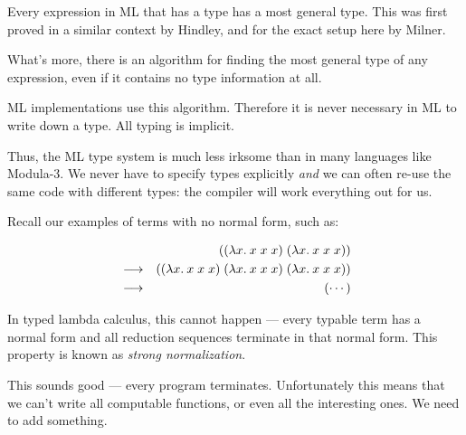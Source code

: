 \begin{slide*}


\vspace*{0.5cm}

Every expression in ML that has a type has a most general type. This was first
proved in a similar context by Hindley, and for the exact setup here by Milner.

What's more, there is an algorithm for finding the most general type of any
expression, even if it contains no type information at all.

ML implementations use this algorithm. Therefore it is never necessary in ML to
write down a type. All typing is implicit.

Thus, the ML type system is much less irksome than in many languages like
Modula-3. We never have to specify types explicitly {\em and} we can often
re-use the same code with different types: the compiler will work everything
out for us.

\end{slide*}



\begin{slide*}


\vspace*{0.5cm}

Recall our examples of terms with no normal form, such as:

\begin{red}
\begin{eqnarray*}
& & ((\lambda x.\: x\; x\; x)\;(\lambda x.\: x\; x\; x))     \\
& \longrightarrow & ((\lambda x.\: x\; x\; x)\;(\lambda x.\: x\; x\; x)\;
                            (\lambda x.\: x\; x\; x))                           \\
& \longrightarrow & (\cdots)
\end{eqnarray*}
\end{red}
In typed lambda calculus, this cannot happen --- every typable term has a
normal form and all reduction sequences terminate in that normal form. This
property is known as {\em strong normalization}.

This sounds good --- every program terminates. Unfortunately this means that we
can't write all computable functions, or even all the interesting ones. We need
to add something.

\end{slide*}



